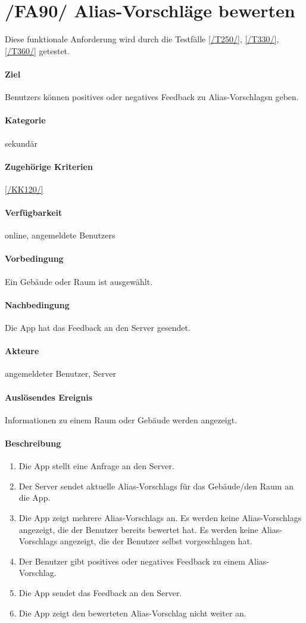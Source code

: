 \section[Alias-Vorschläge bewerten]{/FA90/ Alias-Vorschläge bewerten}
\label{/FA90/}
Diese funktionale Anforderung wird durch die Testfälle \ref{/T250/}, \ref{/T330/}, \ref{/T360/} getestet.
\paragraph{Ziel}
\Glspl{Benutzer} können positives oder negatives Feedback zu \Glspl{Alias-Vorschlag}n geben.
\paragraph{Kategorie}
sekundär
\paragraph{Zugehörige Kriterien}
\ref{/KK120/}
\paragraph{Verfügbarkeit}
online, angemeldete \Glspl{Benutzer}
\paragraph{Vorbedingung}
Ein Gebäude oder Raum ist ausgewählt.
\paragraph{Nachbedingung}
Die App hat das Feedback an den \Gls{Server} gesendet.
\paragraph{Akteure}
angemeldeter \Gls{Benutzer}, \Gls{Server}
\paragraph{Auslösendes Ereignis}
Informationen zu einem Raum oder Gebäude werden angezeigt.
\paragraph{Beschreibung}
\begin{enumerate}
    \item Die App stellt eine Anfrage an den \Gls{Server}.
    \item Der \Gls{Server} sendet aktuelle \Glspl{Alias-Vorschlag} für das Gebäude/den Raum an die App.
    \item Die App zeigt mehrere \Glspl{Alias-Vorschlag} an. Es werden keine \Glspl{Alias-Vorschlag} angezeigt, die der \Gls{Benutzer} bereits bewertet hat. Es werden keine \Glspl{Alias-Vorschlag} angezeigt, die der \Gls{Benutzer} selbst vorgeschlagen hat.
    \item Der \Gls{Benutzer} gibt positives oder negatives Feedback zu einem \Gls{Alias-Vorschlag}.
    \item Die App sendet das Feedback an den \Gls{Server}.
    \item Die App zeigt den bewerteten \Gls{Alias-Vorschlag} nicht weiter an.
\end{enumerate}